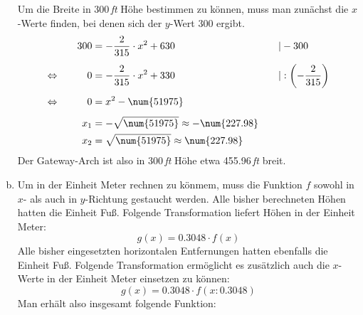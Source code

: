 \begin{exercise}
\begin{enumerate}[a)]
\begin{equation*}
            \end{equation*}
            Um die Breite in \num{300}\,\textit{ft}
            Höhe bestimmen zu können, muss man
            zunächst die $x$-Werte finden, bei
            denen sich der $y$-Wert \num{300}
            ergibt.
            \begin{alignat*}{3}
              \relax&\quad
              &
              300&=-\frac{2}{315}\cdot x^2+630
              &
              \quad&|-300
              \\[1ex]
              \Leftrightarrow&\quad
              &
              0&=-\frac{2}{315}\cdot x^2+330
              &
              \quad&|:\left(-\frac{2}{315}\right)
              \\[1ex]
              \Leftrightarrow&\quad
              &
              0&=x^2-\num{51975}
              &
              \quad&\relax
              \\[1ex]
              \relax&\quad
              &
              x_1&=-\sqrt{\num{51975}}\approx-\num{227.98}
              &
              \quad&\relax
              \\
              \relax&\quad
              &
              x_2&=\sqrt{\num{51975}}\approx\num{227.98}
              &
              \quad&\relax
            \end{alignat*}
            Der Gateway-Arch ist also in \num{300}\,\textit{ft}
            Höhe etwa \num{455.96}\,\textit{ft} breit.
      \item Um in der Einheit Meter rechnen zu könmem,
            muss die Funktion $f$ sowohl in $x$-
            als auch in $y$-Richtung gestaucht
            werden. Alle bisher berechneten Höhen
            hatten die Einheit Fuß. Folgende
            Transformation liefert Höhen in der
            Einheit Meter:
            \begin{equation*}
              g(x)=\num{0.3048}\cdot f(x)
            \end{equation*}
            Alle bisher eingesetzten horizontalen
            Entfernungen hatten ebenfalls die Einheit Fuß.
            Folgende Transformation ermöglicht es zusätzlich
            auch die $x$-Werte in der Einheit Meter einsetzen
            zu können:
            \begin{equation*}
              g(x)=\num{0.3048}\cdot f(x:\num{0.3048})
            \end{equation*}
            Man erhält also insgesamt folgende Funktion:
            \begin{equation*}

\end{equation*}
\end{enumerate}
\end{exercise}
